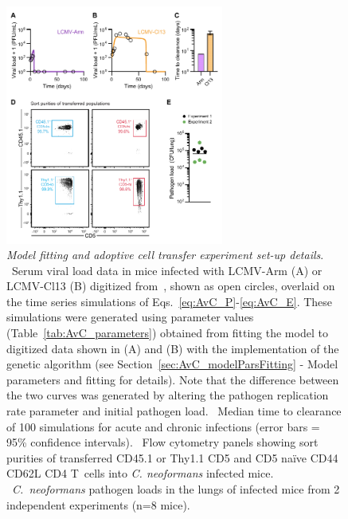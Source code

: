 \renewcommand{\thefigure}{S\thechapter.\arabic{figure}}
\setcounter{figure}{0}

\begin{figure}[htbp]
    \centering
    \includegraphics[width=0.64\textwidth]{Figures/AvC/figS1_timeSeries.pdf}
    \caption[Model fitting and adoptive cell transfer experiment set-up details]{\textit{Model fitting and adoptive cell transfer experiment set-up details}. %
    ~Serum viral load data in mice infected with LCMV-Arm (A) or LCMV-Cl13 (B) digitized from~\cite{wherry2003viral}, shown as open circles, overlaid on the time series simulations of Eqs.~\eqref{eq:AvC_P}-\eqref{eq:AvC_E}. These simulations were generated using parameter values (Table~\ref{tab:AvC_parameters}) obtained from fitting the model to digitized data shown in (A) and (B) with the implementation of the genetic algorithm (see Section~\ref{sec:AvC_modelParsFitting} - Model parameters and fitting for details). Note that the difference between the two curves was generated by altering the pathogen replication rate parameter and initial pathogen load. %
    ~Median time to clearance of 100 simulations for acute and chronic infections (error bars = 95\% confidence intervals). %
    ~Flow cytometry panels showing sort purities of transferred CD45.1\pos{} or Thy1.1\pos{} CD5 and CD5 na\"{i}ve CD44 CD62L\pos{} CD4\pos{} T~cells into \textit{C. neoformans} infected mice. %
    ~\textit{C.~neoformans} pathogen loads in the lungs of infected mice from 2 independent experiments (n=8 mice).}
    \label{fig:AvC_supp_timeSeries}
\end{figure}

